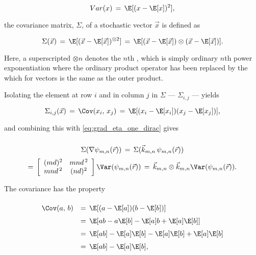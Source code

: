 {\begin{equation} \label{eq:variance_definition}
Var(x) \,=\, \E[(x - \E[x])^2],
\end{equation}

the covariance matrix, $\Sigma$, of a stochastic vector $\vec{x}$ is defined as

\begin{equation} \label{eq:covariance_matrix_definition}
\Sigma(\vec{x}) \,=\, \E[(\vec{x} - \E[\vec{x}])^{\otimes 2}] \,=\, \E[(\vec{x} - \E[\vec{x}])\otimes(\vec{x} - \E[\vec{x}])].
\end{equation}

Here, a superscripted $\otimes n$ denotes the $n$th , which is simply ordinary $n$th power exponentiation where the ordinary product operator has been replaced by the  which for vectors is the same as the outer product.

Isolating the element at row $i$ and in column $j$ in $\Sigma$ --- $\Sigma_{i,j}$ --- yields

\begin{equation} \label{eq:covariance_matrix_element}
\Sigma_{i,j}(\vec{x}) \,=\, \Cov(x_i,\,x_j) \,=\, \E[(x_i - \E[x_i])(x_j - \E[x_j])],
\end{equation}

and combining this with \eqref{eq:grad_eta_one_dirac} gives

\begin{equation} \label{eq:covariance_matrix_gradient_eta_mn}
\renewcommand*{\arraystretch}{2}
\begin{array}{c}
\Sigma(\nabla\psi_{m,n}(\vec{r})) \,=\, \Sigma(\vec{k}_{m,n}\,\psi_{m,n}(\vec{r})) \\
=\,
\left[\renewcommand*{\arraystretch}{1}
\begin{array}{cc}
(md)^2 & mnd^{\,2} \\
mnd^{\,2} & (nd)^2
\end{array}
\right]
\Var(\psi_{m,n}(\vec{r})) \,=\, \vec{k}_{m,n}\otimes\vec{k}_{m,n} \Var(\psi_{m,n}(\vec{r})).
\end{array}
\end{equation}

The covariance has the property

\begin{equation}
\renewcommand*{\arraystretch}{1.5}
\begin{array}{rl}
\Cov(a,\,b)
& =\, \E[(a-\E[a])(b-\E[b])] \\
& =\, \E[ab - a\E[b] - \E[a]b + \E[a]\E[b]] \\
& =\, \E[ab] - \E[a]\E[b] - \E[a]\E[b] + \E[a]\E[b] \\
& =\, \E[ab] - \E[a]\E[b],
\end{array}
\end{equation}

}
